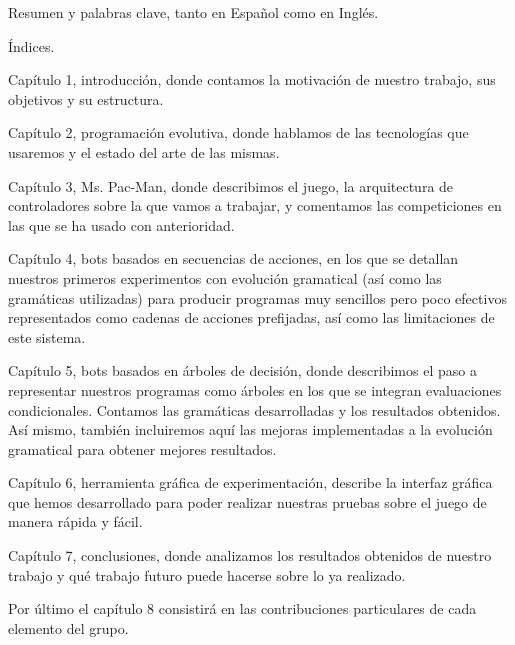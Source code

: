 Resumen y palabras clave, tanto en Español como en Inglés.

Índices.

Capítulo 1, introducción, donde contamos la motivación de nuestro trabajo, sus objetivos y su estructura.

Capítulo 2, programación evolutiva, donde hablamos de las tecnologías que usaremos y el estado del arte de las mismas.

Capítulo 3, Ms. Pac-Man, donde describimos el juego, la arquitectura de controladores sobre la que vamos a trabajar, y comentamos las competiciones en las que se ha usado con anterioridad.

Capítulo 4, bots basados en secuencias de acciones, en los que se detallan nuestros primeros experimentos con evolución gramatical (así como las gramáticas utilizadas) para producir programas muy sencillos pero poco efectivos representados como cadenas de acciones prefijadas, así como las limitaciones de este sistema.

Capítulo 5, bots basados en árboles de decisión, donde describimos el paso a representar nuestros programas como árboles en los que se integran evaluaciones condicionales. Contamos las gramáticas desarrolladas y los resultados obtenidos. Así mismo, también incluiremos aquí las mejoras implementadas a la evolución gramatical para obtener mejores resultados.

Capítulo 6, herramienta gráfica de experimentación, describe la interfaz gráfica que hemos desarrollado para poder realizar nuestras pruebas sobre el juego de manera rápida y fácil.

Capítulo 7, conclusiones, donde analizamos los resultados obtenidos de nuestro trabajo y qué trabajo futuro puede hacerse sobre lo ya realizado.

Por último el capítulo 8 consistirá en las contribuciones particulares de cada elemento del grupo.
